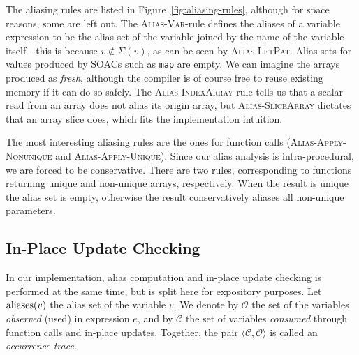 The aliasing rules are listed in Figure~\ref{fig:aliasing-rules},
although for space reasons, some are left out.  The
\textsc{Alias-Var}-rule defines the aliases of a variable expression
to be the alias set of the variable joined by the name of the variable
itself - this is because $v \notin \Sigma(v)$, as can be seen by
\textsc{Alias-LetPat}.  Alias sets for values
produced by SOACs such as \lstinline{map} are empty.  We
can imagine the arrays produced as \textit{fresh}, although the
compiler is of course free to reuse existing memory if it can do so
safely.  The \textsc{Alias-IndexArray} rule tells us that a scalar
read from an array does not alias its origin array, but
\textsc{Alias-SliceArray} dictates that an array slice does,
which fits the implementation intuition.


The most interesting aliasing rules are the ones for function calls
(\textsc{Alias-Apply-Nonunique} and \textsc{Alias-Apply-Unique}).
Since our alias analysis is intra-procedural, we are forced to be
conservative.  There are two rules, corresponding to functions
returning unique and non-unique arrays, respectively. When the result
is unique the alias set is empty, otherwise the result conservatively
aliases all non-unique parameters.

\subsection{In-Place Update Checking}

\newcommand{\inPlaceSafe}[3]{#1\ \rhd \langle #2, #3 \rangle}
\newcommand{\consumedOK}[3]{#1 \vdash #2 \triangle #3}

In our implementation, alias computation and in-place update checking
is performed at the same time, but is split here for expository
purposes.  Let $\textrm{aliases}(v)$ the alias set of the variable $v$.  We
denote by $\mathcal{O}$ the set of the variables \textit{observed}
(used) in expression $e$, and by $\mathcal{C}$ the set of variables
\textit{consumed} through function calls and in-place updates.
Together, the pair $\langle\mathcal{C},\mathcal{O}\rangle$ is called
an \textit{occurrence trace}.

